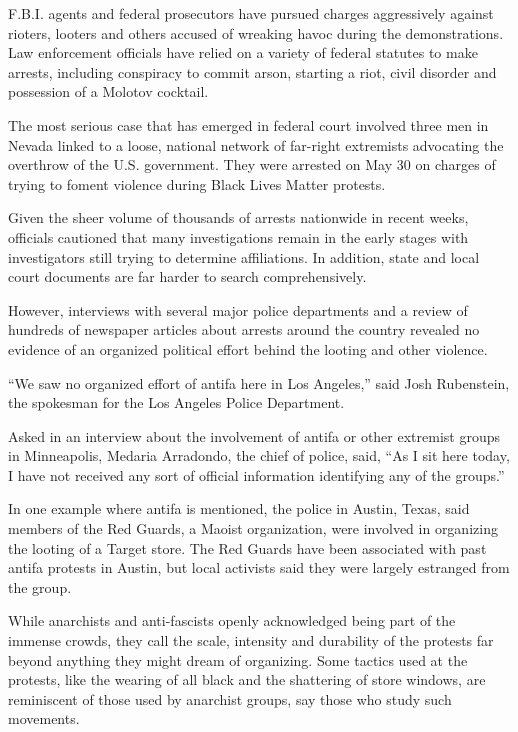 F.B.I. agents and federal prosecutors have pursued charges aggressively
against rioters, looters and others accused of wreaking havoc during the
demonstrations. Law enforcement officials have relied on a variety of
federal statutes to make arrests, including conspiracy to commit arson,
starting a riot, civil disorder and possession of a Molotov cocktail.

The most serious case that has emerged in federal court involved three
men in Nevada linked to a loose, national network of far-right
extremists advocating the overthrow of the U.S. government. They were
arrested on May 30 on charges of trying to foment violence during Black
Lives Matter protests.

Given the sheer volume of thousands of arrests nationwide in recent
weeks, officials cautioned that many investigations remain in the early
stages with investigators still trying to determine affiliations. In
addition, state and local court documents are far harder to search
comprehensively.

However, interviews with several major police departments and a review
of hundreds of newspaper articles about arrests around the country
revealed no evidence of an organized political effort behind the looting
and other violence.

``We saw no organized effort of antifa here in Los Angeles,'' said Josh
Rubenstein, the spokesman for the Los Angeles Police Department.

Asked in an interview about the involvement of antifa or other extremist
groups in Minneapolis, Medaria Arradondo, the chief of police, said,
``As I sit here today, I have not received any sort of official
information identifying any of the groups.''

In one example where antifa is mentioned, the police in Austin, Texas,
said members of the Red Guards, a Maoist organization, were involved in
organizing the looting of a Target store. The Red Guards have been
associated with past antifa protests in Austin, but local activists said
they were largely estranged from the group.

While anarchists and anti-fascists openly acknowledged being part of the
immense crowds, they call the scale, intensity and durability of the
protests far beyond anything they might dream of organizing. Some
tactics used at the protests, like the wearing of all black and the
shattering of store windows, are reminiscent of those used by anarchist
groups, say those who study such movements.

